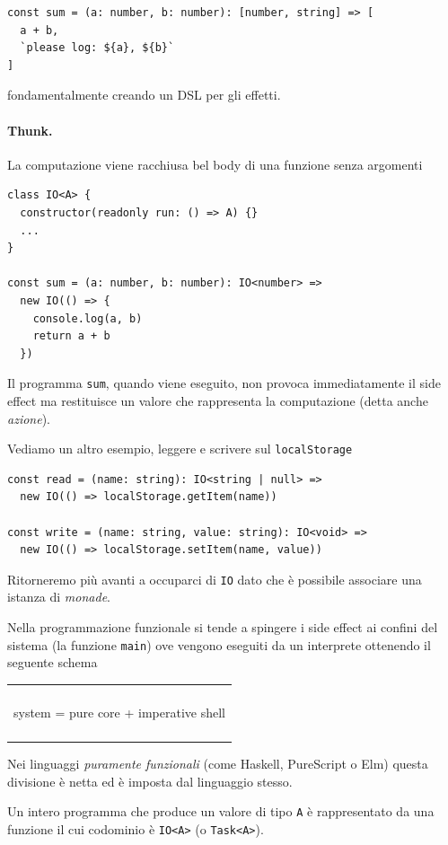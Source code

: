 \documentclass[12pt]{article}
\newenvironment{demo}
    {\begin{center}
    \begin{tabular}{|p{0.9\textwidth}|}
    \hline\\
    }
    {
    \\\\\hline
    \end{tabular}
    \end{center}
    }
\begin{document}
\begin{verbatim}
const sum = (a: number, b: number): [number, string] => [
  a + b,
  `please log: ${a}, ${b}`
]
\end{verbatim}

fondamentalmente creando un DSL per gli effetti.

\paragraph{Thunk.} La computazione viene racchiusa bel body di una funzione senza argomenti

\begin{verbatim}
class IO<A> {
  constructor(readonly run: () => A) {}
  ...
}

const sum = (a: number, b: number): IO<number> =>
  new IO(() => {
    console.log(a, b)
    return a + b
  })
\end{verbatim}

Il programma \texttt{sum}, quando viene eseguito, non provoca immediatamente il side effect ma restituisce un valore che rappresenta
la computazione (detta anche \emph{azione}).

Vediamo un altro esempio, leggere e scrivere sul \texttt{localStorage}

\begin{verbatim}
const read = (name: string): IO<string | null> =>
  new IO(() => localStorage.getItem(name))

const write = (name: string, value: string): IO<void> =>
  new IO(() => localStorage.setItem(name, value))
\end{verbatim}

Ritorneremo più avanti a occuparci di \texttt{IO} dato che è possibile associare una istanza di \emph{monade}.

Nella programmazione funzionale si tende a spingere i side effect ai confini del sistema (la funzione \texttt{main})
ove vengono eseguiti da un interprete ottenendo il seguente schema

\begin{demo}
\begin{center}
system = pure core + imperative shell
\end{center}
\end{demo}

Nei linguaggi \emph{puramente funzionali} (come Haskell, PureScript o Elm) questa divisione è netta ed è imposta dal linguaggio stesso.

Un intero programma che produce un valore di tipo \texttt{A} è rappresentato da una funzione il cui codominio è \texttt{IO<A>} (o \texttt{Task<A>}).
\end{document}

